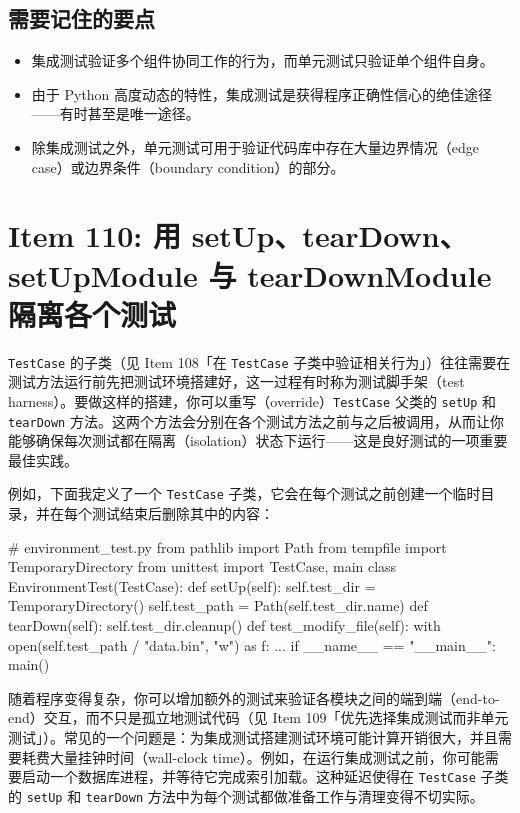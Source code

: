 \subsection{需要记住的要点}

\begin{itemize}
\item 集成测试验证多个组件协同工作的行为，而单元测试只验证单个组件自身。
\item 由于 Python 高度动态的特性，集成测试是获得程序正确性信心的绝佳途径——有时甚至是唯一途径。
\item 除集成测试之外，单元测试可用于验证代码库中存在大量边界情况（edge case）或边界条件（boundary condition）的部分。
\end{itemize}

\section{Item 110: 用 setUp、tearDown、setUpModule 与 tearDownModule 隔离各个测试}

\texttt{TestCase} 的子类（见 Item 108「在 \texttt{TestCase} 子类中验证相关行为」）往往需要在测试方法运行前先把测试环境搭建好，这一过程有时称为测试脚手架（test harness）。要做这样的搭建，你可以重写（override）\texttt{TestCase} 父类的 \texttt{setUp} 和 \texttt{tearDown} 方法。这两个方法会分别在各个测试方法之前与之后被调用，从而让你能够确保每次测试都在隔离（isolation）状态下运行——这是良好测试的一项重要最佳实践。

例如，下面我定义了一个 \texttt{TestCase} 子类，它会在每个测试之前创建一个临时目录，并在每个测试结束后删除其中的内容：

\begin{codebox}[python]
# environment_test.py
from pathlib import Path
from tempfile import TemporaryDirectory
from unittest import TestCase, main
class EnvironmentTest(TestCase):
    def setUp(self):
        self.test_dir = TemporaryDirectory()
        self.test_path = Path(self.test_dir.name)
    def tearDown(self):
        self.test_dir.cleanup()
    def test_modify_file(self):
        with open(self.test_path / "data.bin", "w") as f:
            ...
if __name__ == "__main__":
    main()
\end{codebox}

随着程序变得复杂，你可以增加额外的测试来验证各模块之间的端到端（end-to-end）交互，而不只是孤立地测试代码（见 Item 109「优先选择集成测试而非单元测试」）。常见的一个问题是：为集成测试搭建测试环境可能计算开销很大，并且需要耗费大量挂钟时间（wall-clock time）。例如，在运行集成测试之前，你可能需要启动一个数据库进程，并等待它完成索引加载。这种延迟使得在 \texttt{TestCase} 子类的 \texttt{setUp} 和 \texttt{tearDown} 方法中为每个测试都做准备工作与清理变得不切实际。

